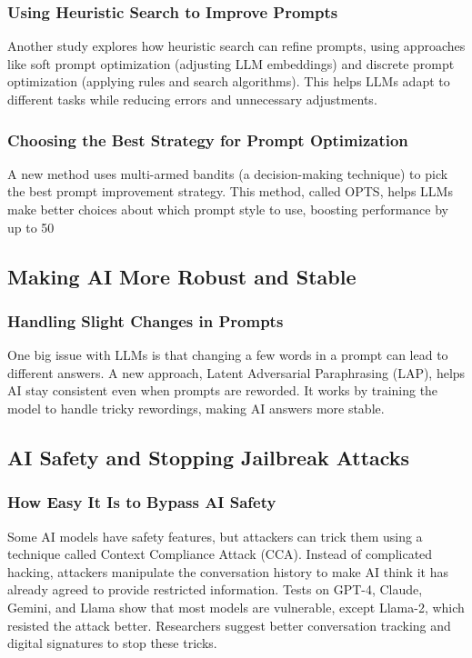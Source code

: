 \documentclass[a4paper,12pt]{article}
\begin{document}
\subsubsection{Using Heuristic Search to Improve Prompts}
Another study explores how heuristic search can refine prompts, using approaches like soft prompt optimization (adjusting LLM embeddings) and discrete prompt optimization (applying rules and search algorithms). This helps LLMs adapt to different tasks while reducing errors and unnecessary adjustments.

\subsubsection{Choosing the Best Strategy for Prompt Optimization}
A new method uses multi-armed bandits (a decision-making technique) to pick the best prompt improvement strategy. This method, called OPTS, helps LLMs make better choices about which prompt style to use, boosting performance by up to 50%

\subsection{Making AI More Robust and Stable}
\subsubsection{Handling Slight Changes in Prompts}
One big issue with LLMs is that changing a few words in a prompt can lead to different answers. A new approach, Latent Adversarial Paraphrasing (LAP), helps AI stay consistent even when prompts are reworded. It works by training the model to handle tricky rewordings, making AI answers more stable.

\subsection{AI Safety and Stopping Jailbreak Attacks}
\subsubsection{How Easy It Is to Bypass AI Safety}
Some AI models have safety features, but attackers can trick them using a technique called Context Compliance Attack (CCA). Instead of complicated hacking, attackers manipulate the conversation history to make AI think it has already agreed to provide restricted information. Tests on GPT-4, Claude, Gemini, and Llama show that most models are vulnerable, except Llama-2, which resisted the attack better. Researchers suggest better conversation tracking and digital signatures to stop these tricks.
\end{document}
